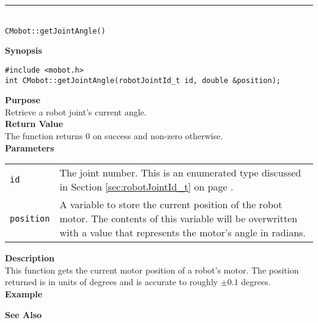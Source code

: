 \noindent
\vspace{5pt}
\rule{4.5in}{0.015in}\\
\noindent
{\LARGE \texttt{CMobot::getJointAngle()}}\\
{}

\noindent
{\bf Synopsis}
\begin{verbatim}
#include <mobot.h>
int CMobot::getJointAngle(robotJointId_t id, double &position);
\end{verbatim}

\noindent
{\bf Purpose}\\
Retrieve a robot joint's current angle.\\

\noindent
{\bf Return Value}\\
The function returns 0 on success and non-zero otherwise.\\

\noindent
{\bf Parameters}\\
\vspace{-0.1in}
\begin{description}
\item               
\begin{tabular}{p{15 mm}p{105 mm}}
\texttt{id} & The joint number. This is an enumerated type 
discussed in Section \ref{sec:robotJointId_t} on page
\pageref{sec:robotJointId_t}.\\
\texttt{position} & A variable to store the current position of the robot
motor. The contents of this variable will be overwritten with a value that
represents the motor's angle in radians.  \\
\end{tabular}
\end{description}

\noindent
{\bf Description}\\
This function gets the current motor position of a robot's motor. The
position returned is in units of degrees and is accurate to roughly $\pm0.1$
degrees. \\

\noindent
{\bf Example}\\
\noindent

\noindent
{\bf See Also}\\

